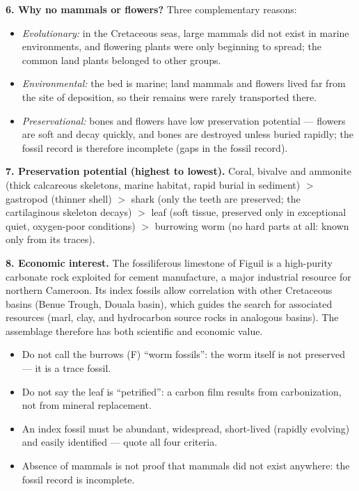 \documentclass[11pt]{article}
\newcommand{\cle}[1]{{\popxbold\color{popdark}#1}}
\begin{document}
\textbf{6. Why no mammals or flowers?} Three complementary reasons:
\begin{itemize}
\item \emph{Evolutionary:} in the Cretaceous seas, large mammals did not exist in marine environments, and flowering plants were only beginning to spread; the common land plants belonged to other groups.
\item \emph{Environmental:} the bed is marine; land mammals and flowers lived far from the site of deposition, so their remains were rarely transported there.
\item \emph{Preservational:} bones and flowers have low preservation potential --- flowers are soft and decay quickly, and bones are destroyed unless buried rapidly; the fossil record is therefore incomplete (\cle{gaps in the fossil record}).
\end{itemize}

\textbf{7. Preservation potential (highest to lowest).} Coral, bivalve and ammonite (thick calcareous skeletons, marine habitat, rapid burial in sediment) $>$ gastropod (thinner shell) $>$ shark (only the teeth are preserved; the cartilaginous skeleton decays) $>$ leaf (soft tissue, preserved only in exceptional quiet, oxygen-poor conditions) $>$ burrowing worm (no hard parts at all: known only from its traces).

\textbf{8. Economic interest.} The fossiliferous limestone of Figuil is a high-purity carbonate rock exploited for \cle{cement manufacture}, a major industrial resource for northern Cameroon. Its index fossils allow \cle{correlation} with other Cretaceous basins (Benue Trough, Douala basin), which guides the search for associated resources (marl, clay, and hydrocarbon source rocks in analogous basins). The assemblage therefore has both scientific and economic value.

\begin{attention}
\begin{itemize}
\item Do not call the burrows (F) ``worm fossils'': the worm itself is not preserved --- it is a trace fossil.
\item Do not say the leaf is ``petrified'': a carbon film results from carbonization, not from mineral replacement.
\item An index fossil must be abundant, widespread, short-lived (rapidly evolving) and easily identified --- quote all four criteria.
\item Absence of mammals is not proof that mammals did not exist anywhere: the fossil record is incomplete.
\end{itemize}
\end{attention}
\end{document}
